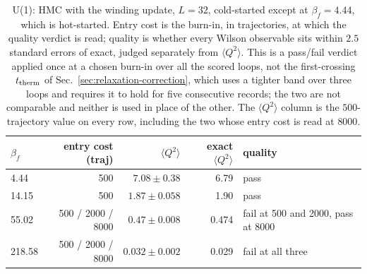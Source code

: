 \documentclass[prd, twocolumn, superscriptaddress, nofootinbib,floatfix]{revtex4-2}
\DeclareRobustCommand{\sect}[1]{Sec.~\ref{sec:#1}}
\begin{document}
\begin{table}[htbp]
\centering
\caption{U(1): HMC with the winding update, $L=32$, cold-started except at
$\beta_f=4.44$, which is hot-started. Entry cost is
the burn-in, in trajectories, at which the quality verdict is read; quality is
whether every Wilson observable sits within $2.5$ standard errors of exact,
judged separately from $\langle Q^2\rangle$. This is a pass/fail verdict applied
once at a chosen burn-in over all the scored loops, not the first-crossing
$t_{\rm therm}$ of \sect{relaxation-correction}, which uses a tighter band over
three loops and requires it to hold for five consecutive records; the two are
not comparable and neither is used in place of the other. The $\langle Q^2\rangle$ column is
the $500$-trajectory value on every row, including the two whose entry cost is
read at $8000$.}
\label{tab:u1_h2h}
\begin{tabular}{lrrrl}
\toprule
$\beta_f$ & entry cost (traj) & $\langle Q^2\rangle$ & exact $\langle Q^2\rangle$ & quality \\
\midrule
4.44   & 500          & $7.08 \pm 0.38$  & 6.79  & pass \\
14.15  & 500          & $1.87 \pm 0.058$ & 1.90  & pass \\
55.02  & 500 / 2000 / 8000 & $0.47 \pm 0.008$ & 0.474 & fail at 500 and 2000, pass at 8000 \\
218.58 & 500 / 2000 / 8000 & $0.032 \pm 0.002$ & 0.029 & fail at all three \\
\bottomrule
\end{tabular}
\end{table}
\end{document}
